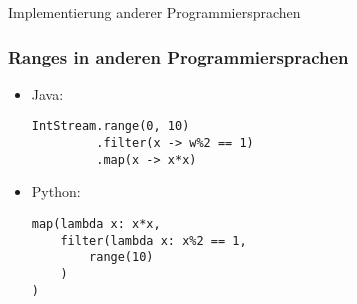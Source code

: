 \begin{frame}[fragile]{Implementierung anderer Programmiersprachen}
\frametitle{Ranges in anderen Programmiersprachen}
\begin{itemize}
\item<1->
    Java:
    \begin{verbatim}
IntStream.range(0, 10)
         .filter(x -> w%2 == 1)
         .map(x -> x*x)
    \end{verbatim}
\item<2->
    Python:
    \begin{verbatim}
map(lambda x: x*x,
    filter(lambda x: x%2 == 1,
        range(10)
    )
)
    \end{verbatim}
\end{itemize}
\end{frame}